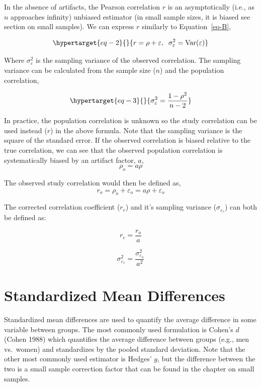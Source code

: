 \documentclass[
  letterpaper,
  DIV=11,
  numbers=noendperiod]{scrreprt}
\begin{document}
In the absence of artifacts, the Pearson correlation \(r\) is an
asymptotically (i.e., as \(n\) approaches infinity) unbiased estimator
(in small sample sizes, it is biased see section on small samples). We
can express \(r\) similarly to Equation~\ref{eq-B},

\begin{equation}\protect\hypertarget{eq-2}{}{
r = \rho + \varepsilon,\;\; \sigma_\varepsilon^2 = \text{Var}(\varepsilon)
}\label{eq-2}\end{equation}

Where \(\sigma^2_\varepsilon\) is the sampling variance of the observed
correlation. The sampling variance can be calculated from the sample
size (\(n\)) and the population correlation,

\begin{equation}\protect\hypertarget{eq-3}{}{
\sigma_\varepsilon^2 =\frac{1 - \rho^2}{n-2}
}\label{eq-3}\end{equation}

In practice, the population correlation is unknown so the study
correlation can be used instead (\(r\)) in the above formula. Note that
the sampling variance is the square of the standard error. If the
observed correlation is biased relative to the true correlation, we can
see that the observed population correlation is systematically biased by
an artifact factor, \(a\), \[
\rho_o = a\rho
\]

The observed study correlation would then be defined as, \[
r_o = \rho_o + \varepsilon_o = a\rho + \varepsilon_o
\]

The corrected correlation coefficient (\(r_c\)) and it's sampling
variance (\(\sigma_{\varepsilon_c}\)) can both be defined as:

\[
r_{c} = \frac{r_o}{a}
\]

\[
\sigma^2_{\varepsilon_c} = \frac{\sigma^2_{\varepsilon_o} }{a^2}
\]

\hypertarget{standardized-mean-differences}{%
\section{Standardized Mean
Differences}\label{standardized-mean-differences}}

Standardized mean differences are used to quantify the average
difference in some variable between groups. The most commonly used
formulation is Cohen's \(d\) (Cohen 1988) which quantifies the average
difference between groups (e.g., men vs.~women) and standardizes by the
pooled standard deviation. Note that the other most commonly used
estimator is Hedges' \(g\), but the difference between the two is a
small sample correction factor that can be found in the chapter on small
samples.
\end{document}
